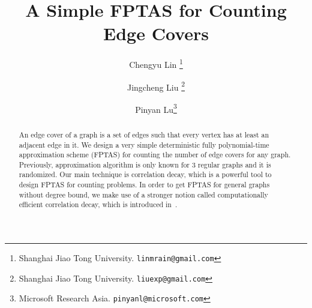 \documentclass[a4paper,11pt]{article}
\title{A Simple FPTAS for Counting Edge Covers}
\date{}
\begin{document}
\author{
	Chengyu Lin
	\thanks{Shanghai Jiao Tong University. {\tt linmrain@gmail.com}}
	\and
	Jingcheng Liu
	\thanks{Shanghai Jiao Tong University. {\tt liuexp@gmail.com}}
	\and
	Pinyan Lu\thanks{Microsoft Research Asia. {\tt pinyanl@microsoft.com}}
}
\maketitle
\begin{abstract}
An edge cover of a graph is a set of edges such that every vertex has at least an adjacent edge in it. We design a very simple deterministic fully polynomial-time approximation scheme  (FPTAS) for counting the number of edge covers for any graph. Previously, approximation algorithm is only known for 3 regular graphs and it is randomized. Our main technique is correlation decay, which is a powerful tool to design FPTAS for counting problems. In order to get FPTAS for general graphs without degree bound, we make use of a stronger notion called computationally efficient correlation decay, which is introduced in~\cite{LLY12}.
\end{abstract}


















\end{document}
